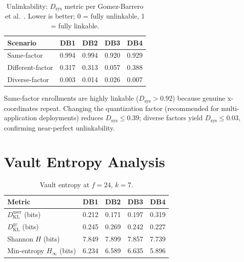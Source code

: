 \begin{table}[h]
\centering
\caption{Unlinkability: $D_{\mathrm{sys}}$ metric per Gomez-Barrero et al.\
\cite{gomezbarrero2017}. Lower is better; 0 = fully unlinkable, 1 = fully linkable.}
\label{tab:dsys}
\small
\begin{tabular}{@{}l cccc@{}}
\toprule
\textbf{Scenario} & \textbf{DB1} & \textbf{DB2} & \textbf{DB3} & \textbf{DB4} \\
\midrule
Same-factor      & 0.994 & 0.994 & 0.920 & 0.929 \\
Different-factor & 0.317 & 0.313 & 0.057 & 0.388 \\
Diverse-factor   & 0.003 & 0.014 & 0.026 & 0.007 \\
\bottomrule
\end{tabular}
\end{table}

Same-factor enrollments are highly linkable ($D_{\mathrm{sys}} > 0.92$) because
genuine x-coordinates repeat. Changing the quantization factor (recommended for
multi-application deployments) reduces $D_{\mathrm{sys}} \leq 0.39$; diverse
factors yield $D_{\mathrm{sys}} \leq 0.03$, confirming near-perfect unlinkability.

\section{Vault Entropy Analysis}
\label{sec:entropy_results}

\begin{table}[h]
\centering
\caption{Vault entropy at $f=24$, $k=7$.}
\label{tab:entropy}
\small
\begin{tabular}{@{}l cccc@{}}
\toprule
\textbf{Metric} & \textbf{DB1} & \textbf{DB2} & \textbf{DB3} & \textbf{DB4} \\
\midrule
$D_{\mathrm{KL}}^{\mathrm{user}}$ (bits) & 0.212 & 0.171 & 0.197 & 0.319 \\
$D_{\mathrm{KL}}^{\mathrm{gc}}$ (bits)   & 0.245 & 0.269 & 0.242 & 0.227 \\
Shannon $H$ (bits)        & 7.849 & 7.899 & 7.857 & 7.739 \\
Min-entropy $H_\infty$ (bits) & 6.234 & 6.589 & 6.635 & 5.896 \\
\bottomrule
\end{tabular}
\end{table}

